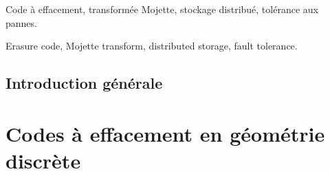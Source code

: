 \begin{resume}
    \footnotesize
    
\end{resume}

\begin{motscles}
    Code à effacement, transformée Mojette, stockage distribué,
    tolérance aux pannes.
\end{motscles}

\begin{abstract}
    \footnotesize
    
\end{abstract}

\begin{keywords}
    Erasure code, Mojette transform, distributed storage, fault tolerance.
\end{keywords}

\maketitle




\dominitoc
\tableofcontents

\newrefsegment

\chapter*{Introduction générale}



%

\part{Codes à effacement en géométrie discrète}


%


%


%

